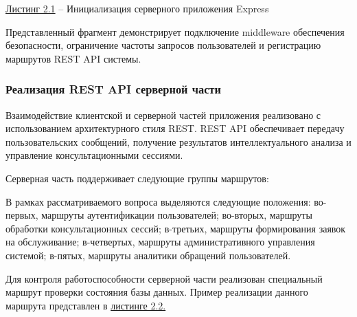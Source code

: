 \documentclass[14pt,a4paper]{extarticle}
\numberwithin{figure}{section}
\numberwithin{table}{section}
\begin{document}
\hyperref[ux43bux438ux441211]{Листинг 2.1} -- Инициализация серверного
приложения Express

Представленный фрагмент демонстрирует подключение middleware обеспечения
безопасности, ограничение частоты запросов пользователей и регистрацию
маршрутов REST API системы.

\subsubsection{Реализация REST API серверной части}

Взаимодействие клиентской и серверной частей приложения реализовано с
использованием архитектурного стиля REST. REST API обеспечивает передачу
пользовательских сообщений, получение результатов интеллектуального
анализа и управление консультационными сессиями.

Серверная часть поддерживает следующие группы маршрутов:


В рамках рассматриваемого вопроса выделяются следующие положения: во-первых, маршруты аутентификации пользователей; во-вторых, маршруты обработки консультационных сессий; в-третьих, маршруты формирования заявок на обслуживание; в-четвертых, маршруты административного управления системой; в-пятых, маршруты аналитики обращений пользователей.


Для контроля работоспособности серверной части реализован специальный
маршрут проверки состояния базы данных. Пример реализации данного
маршрута представлен в
\protect{}\label{ux43bux438ux44122}{}\hyperref[ux43bux438ux441221]{листинге
2.2.}
\end{document}

